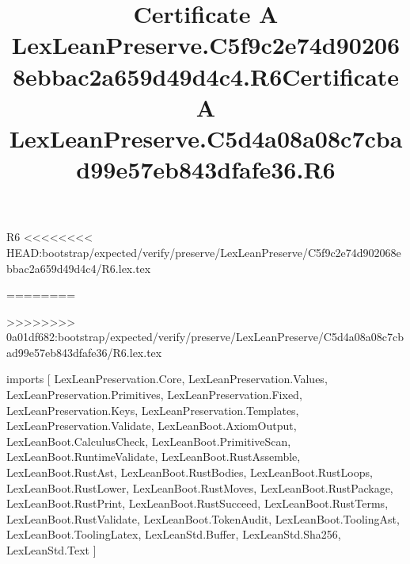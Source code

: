 \begin{lexlean}{R6}
<<<<<<<< HEAD:bootstrap/expected/verify/preserve/LexLeanPreserve/C5f9c2e74d902068ebbac2a659d49d4c4/R6.lex.tex
\title{Certificate A LexLeanPreserve.C5f9c2e74d902068ebbac2a659d49d4c4.R6}
========
\title{Certificate A LexLeanPreserve.C5d4a08a08c7cbad99e57eb843dfafe36.R6}
>>>>>>>> 0a01df682:bootstrap/expected/verify/preserve/LexLeanPreserve/C5d4a08a08c7cbad99e57eb843dfafe36/R6.lex.tex
\begin{coremodule}
imports [
  LexLeanPreservation.Core,
  LexLeanPreservation.Values,
  LexLeanPreservation.Primitives,
  LexLeanPreservation.Fixed,
  LexLeanPreservation.Keys,
  LexLeanPreservation.Templates,
  LexLeanPreservation.Validate,
  LexLeanBoot.AxiomOutput,
  LexLeanBoot.CalculusCheck,
  LexLeanBoot.PrimitiveScan,
  LexLeanBoot.RuntimeValidate,
  LexLeanBoot.RustAssemble,
  LexLeanBoot.RustAst,
  LexLeanBoot.RustBodies,
  LexLeanBoot.RustLoops,
  LexLeanBoot.RustLower,
  LexLeanBoot.RustMoves,
  LexLeanBoot.RustPackage,
  LexLeanBoot.RustPrint,
  LexLeanBoot.RustSucceed,
  LexLeanBoot.RustTerms,
  LexLeanBoot.RustValidate,
  LexLeanBoot.TokenAudit,
  LexLeanBoot.ToolingAst,
  LexLeanBoot.ToolingLatex,
  LexLeanStd.Buffer,
  LexLeanStd.Sha256,
  LexLeanStd.Text
]


\end{coremodule}
\end{lexlean}
